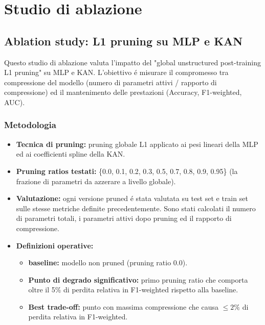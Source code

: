 \documentclass[a4paper,12pt]{report}
\begin{document}
	\section{Studio di ablazione}
	
	\subsection{Ablation study: L1 pruning su MLP e KAN}
	Questo studio di ablazione valuta l'impatto del "global unstructured post-training L1 pruning" su MLP e KAN. L'obiettivo é misurare il compromesso tra compressione del modello (numero di parametri attivi / rapporto di compressione) ed il mantenimento delle prestazioni (Accuracy, F1-weighted, AUC).
	
	\subsubsection{Metodologia}
	\begin{itemize}
		\item \textbf{Tecnica di pruning:} pruning globale L1 applicato ai pesi lineari della MLP ed ai coefficienti spline della KAN.
		\item \textbf{Pruning ratios testati:} \{0.0, 0.1, 0.2, 0.3, 0.5, 0.7, 0.8, 0.9, 0.95\} (la frazione di parametri da azzerare a livello globale).
		\item \textbf{Valutazione:} ogni versione pruned é stata valutata su test set e train set sulle stesse metriche definite precedentemente. Sono stati calcolati il numero di parametri totali, i parametri attivi dopo pruning ed il rapporto di compressione.
		\item \textbf{Definizioni operative:} 
		\begin{itemize}
			\item \textbf{baseline:} modello non pruned (pruning ratio 0.0).
			\item \textbf{Punto di degrado significativo:} primo pruning ratio che comporta oltre il 5\% di perdita relativa in F1-weighted rispetto alla baseline.
			\item \textbf{Best trade-off:} punto con massima compressione che causa \(\le 2\%\) di perdita relativa in F1-weighted.
		\end{itemize}
	\end{itemize}
	
\end{document}
